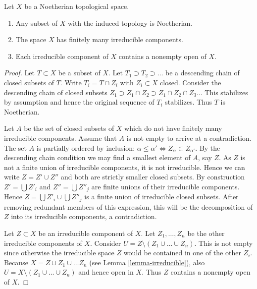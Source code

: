 \begin{lemma}
\label{lemma-Noetherian}
Let $X$ be a Noetherian topological space.
\begin{enumerate}
\item Any subset of $X$ with the induced topology is Noetherian.
\item The space $X$ has finitely many irreducible components.
\item Each irreducible component of $X$ contains a nonempty open of $X$.
\end{enumerate}
\end{lemma}

\begin{proof}
Let $T \subset X$ be a subset of $X$.
Let $T_1 \supset T_2 \supset \ldots$
be a descending chain of closed subsets of $T$.
Write $T_i =  T \cap Z_i$ with $Z_i \subset X$ closed.
Consider the descending chain of closed subsets
$Z_1 \supset Z_1\cap Z_2 \supset Z_1 \cap Z_2 \cap Z_3 \ldots$
This stabilizes by assumption and hence the original sequence
of $T_i$ stabilizes. Thus $T$ is Noetherian.

\medskip\noindent
Let $A$ be the set of closed subsets of $X$ which do not
have finitely many irreducible components. Assume that
$A$ is not empty to arrive at a contradiction.
The set $A$ is partially ordered by inclusion: $\alpha \leq \alpha'
\Leftrightarrow Z_{\alpha} \subset Z_{\alpha'}$.
By the descending chain condition we may find a
smallest element of $A$, say $Z$. As $Z$ is not a finite
union of irreducible components, it is not irreducible.
Hence we can write $Z = Z' \cup Z''$ and both are strictly smaller
closed subsets. By construction $Z' = \bigcup Z'_i$ and
$Z'' = \bigcup Z''_j$ are finite unions of their irreducible
components. Hence $Z = \bigcup Z'_i \cup \bigcup Z''_j$ is
a finite union of irreducible closed subsets.
After removing redundant members of this expression,
this will be the decomposition of $Z$ into its irreducible
components, a contradiction.

\medskip\noindent
Let $Z \subset X$ be an irreducible component of $X$.
Let $Z_1, \ldots, Z_n$ be the other irreducible components
of $X$. Consider $U = Z \setminus (Z_1\cup\ldots\cup Z_n)$.
This is not empty since otherwise the irreducible space
$Z$ would be contained in one of the other $Z_i$.
Because $X = Z \cup Z_1 \cup \ldots Z_n$ (see Lemma \ref{lemma-irreducible}),
also $U = X \setminus (Z_1\cup\ldots\cup Z_n)$
and hence open in $X$. Thus $Z$ contains a nonempty
open of $X$.
\end{proof}

